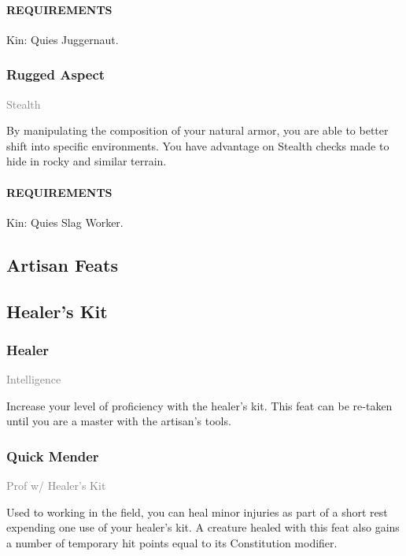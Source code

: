     \paragraph{REQUIREMENTS} Kin: Quies Juggernaut.

    \subsubsection{Rugged Aspect} \label{feat::ruggedaspect}
    \small{\textcolor{gray}{Stealth}}

    \normalsize
    By manipulating the composition of your natural armor, you are able to better shift into specific environments.
    You have advantage on Stealth checks made to hide in rocky and similar terrain.
    \paragraph{REQUIREMENTS} Kin: Quies Slag Worker.


\subsection{Artisan Feats}
\subsection*{Healer's Kit}
    \subsubsection{Healer} \label{feat::healer}
    \small{\textcolor{gray}{Intelligence}} %

    \normalsize
    Increase your level of proficiency with the healer's kit.
    This feat can be re-taken until you are a master with the artisan's tools.

    \subsubsection{Quick Mender} \label{feat::quickmender}
    \small{\textcolor{gray}{Prof w/ Healer's Kit}}

    \normalsize
    Used to working in the field, you can heal minor injuries as part of a short rest expending one use of your healer's kit.
    A creature healed with this feat also gains a number of temporary hit points equal to its Constitution modifier.
